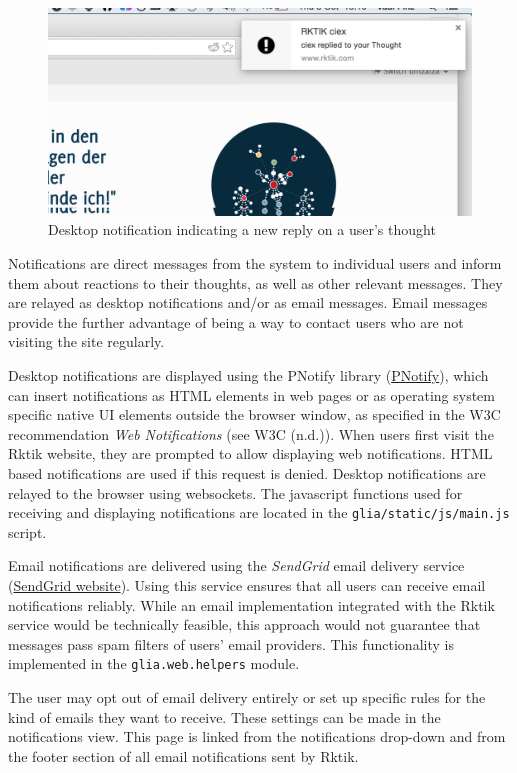 \begin{figure}[htbp]
\centering
\includegraphics{img/desktop_notification.png}
\caption{Desktop notification indicating a new reply on a user's
thought}
\end{figure}

Notifications are direct messages from the system to individual users
and inform them about reactions to their thoughts, as well as other
relevant messages. They are relayed as desktop notifications and/or as
email messages. Email messages provide the further advantage of being a
way to contact users who are not visiting the site regularly.

Desktop notifications are displayed using the PNotify library
(\href{http://sciactive.github.io/pnotify/}{PNotify}), which can insert
notifications as HTML elements in web pages or as operating system
specific native UI elements outside the browser window, as specified in
the W3C recommendation \emph{Web Notifications} (see W3C (n.d.)). When
users first visit the Rktik website, they are prompted to allow
displaying web notifications. HTML based notifications are used if this
request is denied. Desktop notifications are relayed to the browser
using websockets. The javascript functions used for receiving and
displaying notifications are located in the
\texttt{glia/static/js/main.js} script.

Email notifications are delivered using the \emph{SendGrid} email
delivery service (\href{https://sendgrid.com/}{SendGrid website}). Using
this service ensures that all users can receive email notifications
reliably. While an email implementation integrated with the Rktik
service would be technically feasible, this approach would not guarantee
that messages pass spam filters of users' email providers. This
functionality is implemented in the \texttt{glia.web.helpers} module.

The user may opt out of email delivery entirely or set up specific rules
for the kind of emails they want to receive. These settings can be made
in the notifications view. This page is linked from the notifications
drop-down and from the footer section of all email notifications sent by
Rktik.

